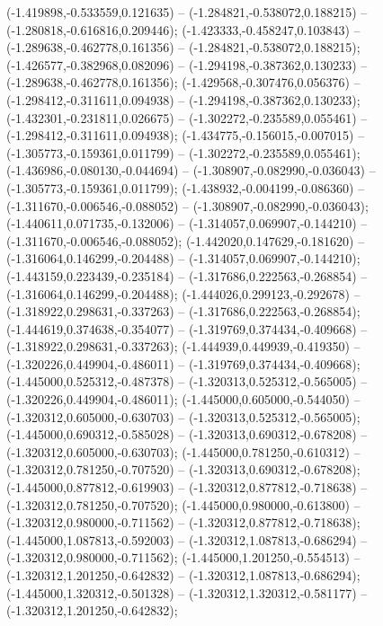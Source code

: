  (-1.419898,-0.533559,0.121635) -- (-1.284821,-0.538072,0.188215) -- (-1.280818,-0.616816,0.209446);
 (-1.423333,-0.458247,0.103843) -- (-1.289638,-0.462778,0.161356) -- (-1.284821,-0.538072,0.188215);
 (-1.426577,-0.382968,0.082096) -- (-1.294198,-0.387362,0.130233) -- (-1.289638,-0.462778,0.161356);
 (-1.429568,-0.307476,0.056376) -- (-1.298412,-0.311611,0.094938) -- (-1.294198,-0.387362,0.130233);
 (-1.432301,-0.231811,0.026675) -- (-1.302272,-0.235589,0.055461) -- (-1.298412,-0.311611,0.094938);
 (-1.434775,-0.156015,-0.007015) -- (-1.305773,-0.159361,0.011799) -- (-1.302272,-0.235589,0.055461);
 (-1.436986,-0.080130,-0.044694) -- (-1.308907,-0.082990,-0.036043) -- (-1.305773,-0.159361,0.011799);
 (-1.438932,-0.004199,-0.086360) -- (-1.311670,-0.006546,-0.088052) -- (-1.308907,-0.082990,-0.036043);
 (-1.440611,0.071735,-0.132006) -- (-1.314057,0.069907,-0.144210) -- (-1.311670,-0.006546,-0.088052);
 (-1.442020,0.147629,-0.181620) -- (-1.316064,0.146299,-0.204488) -- (-1.314057,0.069907,-0.144210);
 (-1.443159,0.223439,-0.235184) -- (-1.317686,0.222563,-0.268854) -- (-1.316064,0.146299,-0.204488);
 (-1.444026,0.299123,-0.292678) -- (-1.318922,0.298631,-0.337263) -- (-1.317686,0.222563,-0.268854);
 (-1.444619,0.374638,-0.354077) -- (-1.319769,0.374434,-0.409668) -- (-1.318922,0.298631,-0.337263);
 (-1.444939,0.449939,-0.419350) -- (-1.320226,0.449904,-0.486011) -- (-1.319769,0.374434,-0.409668);
 (-1.445000,0.525312,-0.487378) -- (-1.320313,0.525312,-0.565005) -- (-1.320226,0.449904,-0.486011);
 (-1.445000,0.605000,-0.544050) -- (-1.320312,0.605000,-0.630703) -- (-1.320313,0.525312,-0.565005);
 (-1.445000,0.690312,-0.585028) -- (-1.320313,0.690312,-0.678208) -- (-1.320312,0.605000,-0.630703);
 (-1.445000,0.781250,-0.610312) -- (-1.320312,0.781250,-0.707520) -- (-1.320313,0.690312,-0.678208);
 (-1.445000,0.877812,-0.619903) -- (-1.320312,0.877812,-0.718638) -- (-1.320312,0.781250,-0.707520);
 (-1.445000,0.980000,-0.613800) -- (-1.320312,0.980000,-0.711562) -- (-1.320312,0.877812,-0.718638);
 (-1.445000,1.087813,-0.592003) -- (-1.320312,1.087813,-0.686294) -- (-1.320312,0.980000,-0.711562);
 (-1.445000,1.201250,-0.554513) -- (-1.320312,1.201250,-0.642832) -- (-1.320312,1.087813,-0.686294);
 (-1.445000,1.320312,-0.501328) -- (-1.320312,1.320312,-0.581177) -- (-1.320312,1.201250,-0.642832);

